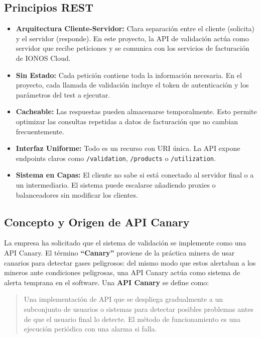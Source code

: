 \subsection{Principios REST}
\begin{itemize}
    \item \textbf{Arquitectura Cliente-Servidor: } Clara separación entre el cliente (solicita) y el servidor (responde). En este proyecto, la API de validación actúa como servidor que recibe peticiones y se comunica con los servicios de facturación de IONOS Cloud.
    \item \textbf{Sin Estado: } Cada petición contiene toda la información necesaria. En el proyecto, cada llamada de validación incluye el token de autenticación y los parámetros del test a ejecutar.
    \item \textbf{Cacheable: } Las respuestas pueden almacenarse temporalmente. Esto permite optimizar las consultas repetidas a datos de facturación que no cambian frecuentemente.
    \item \textbf{Interfaz Uniforme: } Todo es un recurso con URI única. La API expone endpoints claros como \texttt{/validation}, \texttt{/products} o \texttt{/utilization}.
    \item \textbf{Sistema en Capas: } El cliente no sabe si está conectado al servidor final o a un intermediario. El sistema puede escalarse añadiendo proxies o balanceadores sin modificar los clientes.

\end{itemize}

\subsection{Concepto y Origen de API Canary}

La empresa ha solicitado que el sistema de validación se implemente como una API Canary. El término \textbf{``Canary''} proviene de la práctica minera de usar canarios para detectar gases peligrosos: del mismo modo que estos alertaban a los mineros ante condiciones peligrosas, una API Canary actúa como sistema de alerta temprana en el software. Una \textbf{API Canary} se define como:

\begin{quote}
    Una implementación de API que se despliega gradualmente a un subconjunto de usuarios o sistemas para detectar posibles problemas antes de que el usuario final lo detecte. El método de funcionamiento es una ejecución periódica con una alarma si falla.
\end{quote}

